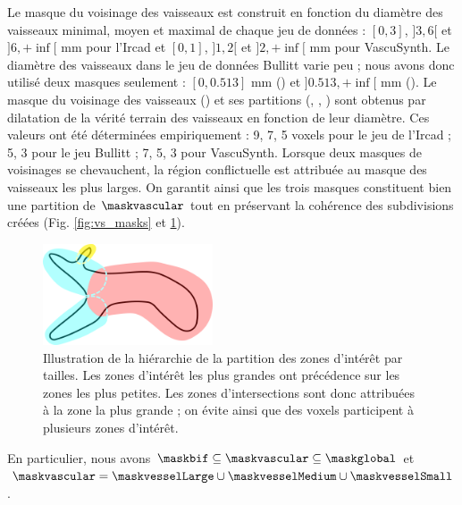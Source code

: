 Le masque du voisinage des vaisseaux est construit en fonction du diamètre des vaisseaux minimal, moyen et maximal de chaque jeu de données : $[0,3]$, $]3,6[$ et $]6,+\inf[$ mm pour l'Ircad et $[0,1]$, $]1,2[$ et $]2,+\inf[$ mm pour VascuSynth. Le diamètre des vaisseaux dans le jeu de données Bullitt varie peu ; nous avons donc utilisé deux masques seulement : $[0,0.513]$ mm (\maskvesselSmall) et $]0.513,+\inf[$ mm (\maskvesselMedium). Le masque du voisinage des vaisseaux (\maskvessel) et ses partitions (\maskvesselLarge, \maskvesselMedium, \maskvesselSmall) sont obtenus par dilatation de la vérité terrain des vaisseaux en fonction de leur diamètre. Ces valeurs ont été déterminées empiriquement : 9, 7, 5 voxels pour le jeu de l'Ircad ; 5, 3 pour le jeu Bullitt ; 7, 5, 3 pour VascuSynth. Lorsque deux masques de voisinages se chevauchent, la région conflictuelle est attribuée au masque des vaisseaux les plus larges. On garantit ainsi que les trois masques constituent bien une partition de $\maskvascular$ tout en préservant la cohérence des subdivisions créées (Fig. \ref{fig:vs_masks} et \ref{fig:numibranch}).

\begin{figure}[!ht]
  \centering
  \includegraphics[height=3cm]{Images/numibranch.png}
  \caption{Illustration de la hiérarchie de la partition des zones d'intérêt par tailles. Les zones d'intérêt les plus grandes ont précédence sur les zones les plus petites. Les zones d'intersections sont donc attribuées à la zone la plus grande ; on évite ainsi que des voxels participent à plusieurs zones d'intérêt.}
  \label{fig:numibranch}
\end{figure}


En particulier, nous avons $\maskbif \subseteq \maskvascular \subseteq \maskglobal$ et $\maskvascular = \maskvesselLarge \cup \maskvesselMedium \cup \maskvesselSmall$.

